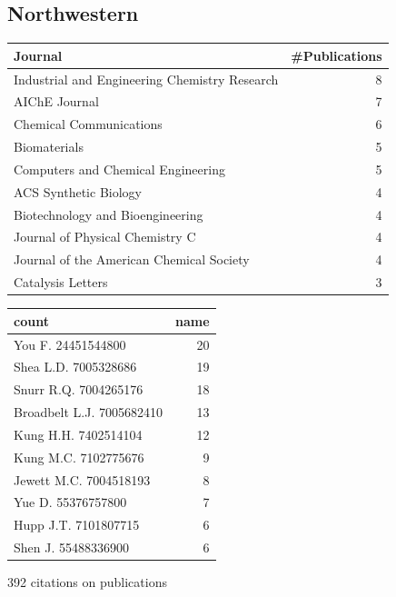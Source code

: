 \documentclass[11pt]{article}
\begin{document}
\subsection{Northwestern}
\label{sec-1-13}
\begin{center}
\begin{tabular}{lr}
Journal & \#Publications\\
\hline
Industrial and Engineering Chemistry Research & 8\\
AIChE Journal & 7\\
Chemical Communications & 6\\
Biomaterials & 5\\
Computers and Chemical Engineering & 5\\
ACS Synthetic Biology & 4\\
Biotechnology and Bioengineering & 4\\
Journal of Physical Chemistry C & 4\\
Journal of the American Chemical Society & 4\\
Catalysis Letters & 3\\
\end{tabular}
\end{center}

\begin{center}
\begin{tabular}{lr}
count & name\\
\hline
You F. 24451544800 & 20\\
Shea L.D. 7005328686 & 19\\
Snurr R.Q. 7004265176 & 18\\
Broadbelt L.J. 7005682410 & 13\\
Kung H.H. 7402514104 & 12\\
Kung M.C. 7102775676 & 9\\
Jewett M.C. 7004518193 & 8\\
Yue D. 55376757800 & 7\\
Hupp J.T. 7101807715 & 6\\
Shen J. 55488336900 & 6\\
\end{tabular}
\end{center}

392 citations on publications
\end{document}

